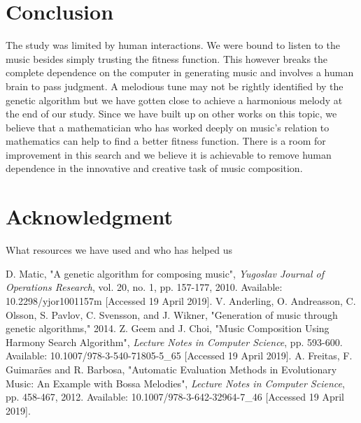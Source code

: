 \documentclass[conference]{IEEEtran}
\begin{document}
\section{Conclusion}
The study was limited by human interactions. We were bound to listen to the music besides simply trusting the fitness function. This however breaks the complete dependence on the computer in generating music and involves a human brain to pass judgment. A melodious tune may not be rightly identified by the genetic algorithm but we have gotten close to achieve a harmonious melody at the end of our study. Since we have built up on other works on this topic, we believe that a mathematician who has worked deeply on music's relation to mathematics can help to find a better fitness function. There is a room for improvement in this search and we believe it is achievable to remove human dependence in the innovative and creative task of music composition.

\section*{Acknowledgment}
What resources we have used and who has helped us


\begin{thebibliography}{00}
 D. Matic, "A genetic algorithm for composing music", \textit{Yugoslav Journal of Operations Research}, vol. 20, no. 1, pp. 157-177, 2010. Available: 10.2298/yjor1001157m [Accessed 19 April 2019].
V. Anderling, O. Andreasson, C. Olsson, S. Pavlov, C. Svensson, and J. Wikner, "Generation of music through genetic algorithms," 2014.
 Z. Geem and J. Choi, "Music Composition Using Harmony Search Algorithm", \textit{Lecture Notes in Computer Science}, pp. 593-600. Available: 10.1007/978-3-540-71805-5\_65 [Accessed 19 April 2019].
 A. Freitas, F. Guimarães and R. Barbosa, "Automatic Evaluation Methods in Evolutionary Music: An Example with Bossa Melodies", \textit{Lecture Notes in Computer Science}, pp. 458-467, 2012. Available: 10.1007/978-3-642-32964-7\_46 [Accessed 19 April 2019].
\end{thebibliography}
\end{document}
